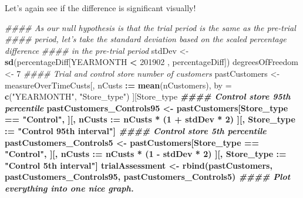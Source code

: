 \documentclass[
]{article}
\newenvironment{Shaded}{\begin{snugshade}}{\end{snugshade}}
\newcommand{\CommentTok}[1]{\textcolor[rgb]{0.56,0.35,0.01}{\textit{#1}}}
\newcommand{\DecValTok}[1]{\textcolor[rgb]{0.00,0.00,0.81}{#1}}
\newcommand{\ErrorTok}[1]{\textcolor[rgb]{0.64,0.00,0.00}{\textbf{#1}}}
\newcommand{\KeywordTok}[1]{\textcolor[rgb]{0.13,0.29,0.53}{\textbf{#1}}}
\newcommand{\NormalTok}[1]{#1}
\newcommand{\OperatorTok}[1]{\textcolor[rgb]{0.81,0.36,0.00}{\textbf{#1}}}
\newcommand{\StringTok}[1]{\textcolor[rgb]{0.31,0.60,0.02}{#1}}
\begin{document}
Let's again see if the difference is significant visually!

\begin{Shaded}
\begin{Highlighting}[]
\CommentTok{#### As our null hypothesis is that the trial period is the same as the pre-trial }
\CommentTok{#### period, let's take the standard deviation based on the scaled percentage difference}
\CommentTok{#### in the pre-trial period}
\NormalTok{stdDev <-}\StringTok{ }\KeywordTok{sd}\NormalTok{(percentageDiff[YEARMONTH }\OperatorTok{<}\StringTok{ }\DecValTok{201902}\NormalTok{ , percentageDiff])}
\NormalTok{degreesOfFreedom <-}\StringTok{ }\DecValTok{7}
\CommentTok{#### Trial and control store number of customers}
\NormalTok{pastCustomers <-}\StringTok{ }\NormalTok{measureOverTimeCusts[, nCusts }\OperatorTok{:}\ErrorTok{=}\StringTok{ }\KeywordTok{mean}\NormalTok{(nCustomers), by =}
\KeywordTok{c}\NormalTok{(}\StringTok{"YEARMONTH"}\NormalTok{, }\StringTok{"Store_type"}\NormalTok{)}
\NormalTok{                            ][Store_type }\OperatorTok{%
\CommentTok{#### Control store 95th percentile}
\NormalTok{pastCustomers_Controls95 <-}\StringTok{ }\NormalTok{pastCustomers[Store_type }\OperatorTok{==}\StringTok{ "Control"}\NormalTok{,}
\NormalTok{                                ][, nCusts }\OperatorTok{:}\ErrorTok{=}\StringTok{ }\NormalTok{nCusts }\OperatorTok{*}\StringTok{ }\NormalTok{(}\DecValTok{1} \OperatorTok{+}\StringTok{ }\NormalTok{stdDev }\OperatorTok{*}\StringTok{ }\DecValTok{2}\NormalTok{)}
\NormalTok{                                ][, Store_type }\OperatorTok{:}\ErrorTok{=}\StringTok{ "Control 95th %
\StringTok{interval"}\NormalTok{]}
\CommentTok{#### Control store 5th percentile}
\NormalTok{pastCustomers_Controls5 <-}\StringTok{ }\NormalTok{pastCustomers[Store_type }\OperatorTok{==}\StringTok{ "Control"}\NormalTok{,}
\NormalTok{                                ][, nCusts }\OperatorTok{:}\ErrorTok{=}\StringTok{ }\NormalTok{nCusts }\OperatorTok{*}\StringTok{ }\NormalTok{(}\DecValTok{1} \OperatorTok{-}\StringTok{ }\NormalTok{stdDev }\OperatorTok{*}\StringTok{ }\DecValTok{2}\NormalTok{)}
\NormalTok{                                ][, Store_type }\OperatorTok{:}\ErrorTok{=}\StringTok{ "Control 5th %
\StringTok{interval"}\NormalTok{]}
\NormalTok{trialAssessment <-}\StringTok{ }\KeywordTok{rbind}\NormalTok{(pastCustomers, pastCustomers_Controls95,}
\NormalTok{pastCustomers_Controls5)}
\CommentTok{#### Plot everything into one nice graph.}
}}}
\end{Highlighting}
\end{Shaded}
\end{document}
